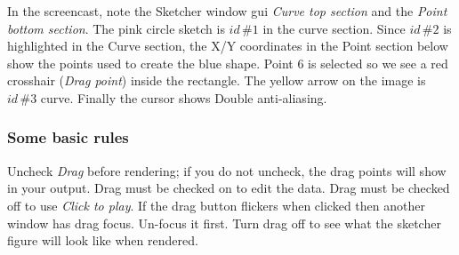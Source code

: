 In the screencast, note the Sketcher window gui \textit{Curve top section} and the \textit{Point bottom section}. The pink circle sketch is $id\,\#1$ in the curve section. Since $id\,\#2$ is highlighted in the Curve section, the X/Y coordinates in the Point section below show the points used to create the blue shape. Point 6 is selected so we see a red crosshair (\textit{Drag point}) inside the rectangle. The yellow arrow on the image is $id\,\#3$ curve. Finally the cursor shows Double anti-aliasing.

\subsubsection*{Some basic rules}%
\label{ssub:some_basic_rules}

Uncheck \textit{Drag} before rendering; if you do not uncheck, the drag points will show in your output.
Drag must be checked on to edit the data. Drag must be checked off to use \textit{Click to play}.
If the drag button flickers when clicked then another window has drag focus. Un-focus it first.
Turn drag off to see what the sketcher figure will look like when rendered.

